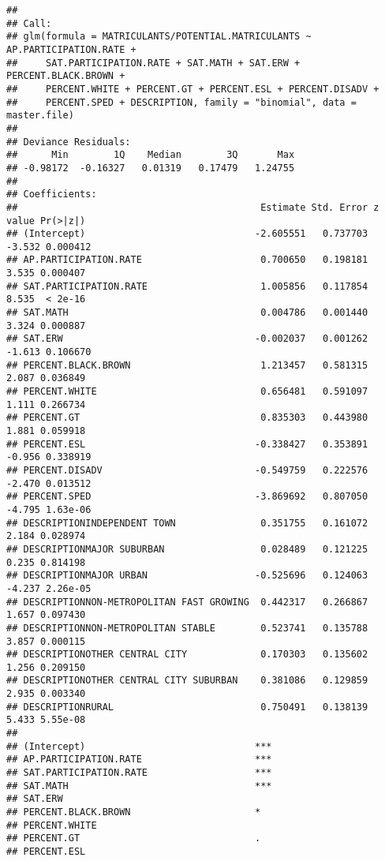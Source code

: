\documentclass[
]{article}
\begin{document}
\begin{verbatim}
## 
## Call:
## glm(formula = MATRICULANTS/POTENTIAL.MATRICULANTS ~ AP.PARTICIPATION.RATE + 
##     SAT.PARTICIPATION.RATE + SAT.MATH + SAT.ERW + PERCENT.BLACK.BROWN + 
##     PERCENT.WHITE + PERCENT.GT + PERCENT.ESL + PERCENT.DISADV + 
##     PERCENT.SPED + DESCRIPTION, family = "binomial", data = master.file)
## 
## Deviance Residuals: 
##      Min        1Q    Median        3Q       Max  
## -0.98172  -0.16327   0.01319   0.17479   1.24755  
## 
## Coefficients:
##                                           Estimate Std. Error z value Pr(>|z|)
## (Intercept)                              -2.605551   0.737703  -3.532 0.000412
## AP.PARTICIPATION.RATE                     0.700650   0.198181   3.535 0.000407
## SAT.PARTICIPATION.RATE                    1.005856   0.117854   8.535  < 2e-16
## SAT.MATH                                  0.004786   0.001440   3.324 0.000887
## SAT.ERW                                  -0.002037   0.001262  -1.613 0.106670
## PERCENT.BLACK.BROWN                       1.213457   0.581315   2.087 0.036849
## PERCENT.WHITE                             0.656481   0.591097   1.111 0.266734
## PERCENT.GT                                0.835303   0.443980   1.881 0.059918
## PERCENT.ESL                              -0.338427   0.353891  -0.956 0.338919
## PERCENT.DISADV                           -0.549759   0.222576  -2.470 0.013512
## PERCENT.SPED                             -3.869692   0.807050  -4.795 1.63e-06
## DESCRIPTIONINDEPENDENT TOWN               0.351755   0.161072   2.184 0.028974
## DESCRIPTIONMAJOR SUBURBAN                 0.028489   0.121225   0.235 0.814198
## DESCRIPTIONMAJOR URBAN                   -0.525696   0.124063  -4.237 2.26e-05
## DESCRIPTIONNON-METROPOLITAN FAST GROWING  0.442317   0.266867   1.657 0.097430
## DESCRIPTIONNON-METROPOLITAN STABLE        0.523741   0.135788   3.857 0.000115
## DESCRIPTIONOTHER CENTRAL CITY             0.170303   0.135602   1.256 0.209150
## DESCRIPTIONOTHER CENTRAL CITY SUBURBAN    0.381086   0.129859   2.935 0.003340
## DESCRIPTIONRURAL                          0.750491   0.138139   5.433 5.55e-08
##                                             
## (Intercept)                              ***
## AP.PARTICIPATION.RATE                    ***
## SAT.PARTICIPATION.RATE                   ***
## SAT.MATH                                 ***
## SAT.ERW                                     
## PERCENT.BLACK.BROWN                      *  
## PERCENT.WHITE                               
## PERCENT.GT                               .  
## PERCENT.ESL                                 

\end{verbatim}
\end{document}
